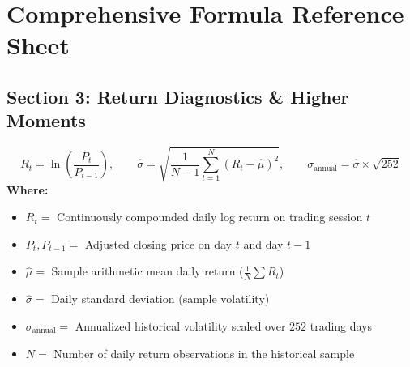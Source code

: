 
\section*{Comprehensive Formula Reference Sheet}

\subsection*{Section 3: Return Diagnostics \& Higher Moments}

\begin{formulabox}
\begin{equation*}
R_t = \ln\left(\frac{P_t}{P_{t-1}}\right), \qquad \hat{\sigma} = \sqrt{\frac{1}{N-1}\sum_{t=1}^N (R_t - \hat{\mu})^2}, \qquad \sigma_{\text{annual}} = \hat{\sigma} \times \sqrt{252}
\end{equation*}
\textbf{Where:}
\begin{itemize}[leftmargin=1.8em, noitemsep]
    \item $R_t =$ Continuously compounded daily log return on trading session $t$
    \item $P_t, P_{t-1} =$ Adjusted closing price on day $t$ and day $t-1$
    \item $\hat{\mu} =$ Sample arithmetic mean daily return ($\frac{1}{N}\sum R_t$)
    \item $\hat{\sigma} =$ Daily standard deviation (sample volatility)
    \item $\sigma_{\text{annual}} =$ Annualized historical volatility scaled over $252$ trading days
    \item $N =$ Number of daily return observations in the historical sample
\end{itemize}
\end{formulabox}

